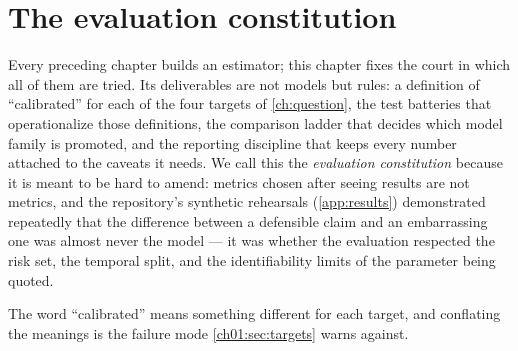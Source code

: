 
\section{The evaluation constitution}\label{ch07:sec:constitution}

Every preceding chapter builds an estimator; this chapter fixes the court in
which all of them are tried. Its deliverables are not models but rules: a
definition of ``calibrated'' for each of the four targets of
\cref{ch:question}, the test batteries that operationalize those
definitions, the comparison ladder that decides which model family is
promoted, and the reporting discipline that keeps every number attached to
the caveats it needs. We call this the \emph{evaluation constitution}
because it is meant to be hard to amend: metrics chosen after seeing
results are not metrics, and the repository's synthetic rehearsals
(\cref{app:results}) demonstrated repeatedly that the difference between a
defensible claim and an embarrassing one was almost never the model --- it
was whether the evaluation respected the risk set, the temporal split, and
the identifiability limits of the parameter being quoted.

The word ``calibrated'' means something different for each target, and
conflating the meanings is the failure mode
\cref{ch01:sec:targets} warns against.

